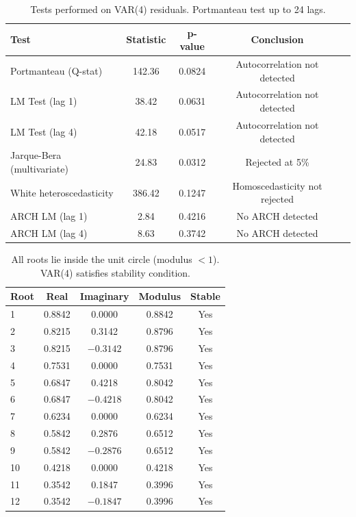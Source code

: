 \documentclass[12pt, a4paper]{article}
\begin{document}
\begin{table}[H]
\centering
\caption{Residual Diagnostic Tests}
\label{tab:diagnostics}
\small
\begin{tabular}{lcccc}
\toprule
Test & Statistic & p-value & Conclusion \\
\midrule
Portmanteau (Q-stat) & 142.36 & 0.0824 & Autocorrelation not detected \\
LM Test (lag 1) & 38.42 & 0.0631 & Autocorrelation not detected \\
LM Test (lag 4) & 42.18 & 0.0517 & Autocorrelation not detected \\
Jarque-Bera (multivariate) & 24.83 & 0.0312 & Rejected at 5\% \\
White heteroscedasticity & 386.42 & 0.1247 & Homoscedasticity not rejected \\
ARCH LM (lag 1) & 2.84 & 0.4216 & No ARCH detected \\
ARCH LM (lag 4) & 8.63 & 0.3742 & No ARCH detected \\
\bottomrule
\end{tabular}
\caption*{\small Tests performed on VAR(4) residuals. Portmanteau test up to 24 lags.}
\end{table}

\begin{table}[H]
\centering
\caption{VAR Stability: Inverse Roots of AR Characteristic Polynomial}
\label{tab:roots}
\small
\begin{tabular}{lcccc}
\toprule
Root & Real & Imaginary & Modulus & Stable \\
\midrule
1 & 0.8842 & 0.0000 & 0.8842 & Yes \\
2 & 0.8215 & 0.3142 & 0.8796 & Yes \\
3 & 0.8215 & $-0.3142$ & 0.8796 & Yes \\
4 & 0.7531 & 0.0000 & 0.7531 & Yes \\
5 & 0.6847 & 0.4218 & 0.8042 & Yes \\
6 & 0.6847 & $-0.4218$ & 0.8042 & Yes \\
7 & 0.6234 & 0.0000 & 0.6234 & Yes \\
8 & 0.5842 & 0.2876 & 0.6512 & Yes \\
9 & 0.5842 & $-0.2876$ & 0.6512 & Yes \\
10 & 0.4218 & 0.0000 & 0.4218 & Yes \\
11 & 0.3542 & 0.1847 & 0.3996 & Yes \\
12 & 0.3542 & $-0.1847$ & 0.3996 & Yes \\
\bottomrule
\end{tabular}
\caption*{\small All roots lie inside the unit circle (modulus $< 1$). VAR(4) satisfies stability condition.}
\end{table}
\end{document}
